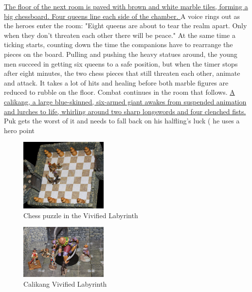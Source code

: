 \hyperref[fig:Chess-puzzle-in-the-Vivified-Labyrinth-565298239]{ The floor of the next room is paved with brown and white marble tiles, forming a big chessboard. Four queens line each side of the chamber. } A voice rings out as the heroes enter the room: "Eight queens are about to tear the realm apart. Only when they don't threaten each other there will be peace." At the same time a ticking starts, counting down the time the companions have to rearrange the pieces on the board. Pulling and pushing the heavy statues around, the young men succeed in getting six queens to a safe position, but when the timer stops after eight minutes, the two chess pieces that still threaten each other, animate and attack. It takes a lot of hits and healing before both marble figures are reduced to rubble on the floor. Combat continues in the room that follows. \hyperref[fig:Calikang-Vivified-Labyrinth-565300031]{ A calikang, a large blue-skinned, six-armed giant awakes from suspended animation and lurches to life, whirling around two sharp longswords and four clenched fists. } Puk gets the worst of it and needs to fall back on his halfling's luck ( he uses a hero point \\

\begin{figure}[h]
	\centering
	\includegraphics[width=0.39\textwidth]{images/Chess-puzzle-in-the-Vivified-Labyrinth-565298239.jpg}
	\caption{Chess puzzle in the Vivified Labyrinth}
	\label{fig:Chess-puzzle-in-the-Vivified-Labyrinth-565298239}
\end{figure}

\begin{figure}[h]
	\centering
	\includegraphics[width=0.39\textwidth]{images/Calikang-Vivified-Labyrinth-565300031.jpg}
	\caption{Calikang Vivified Labyrinth}
	\label{fig:Calikang-Vivified-Labyrinth-565300031}
\end{figure}

